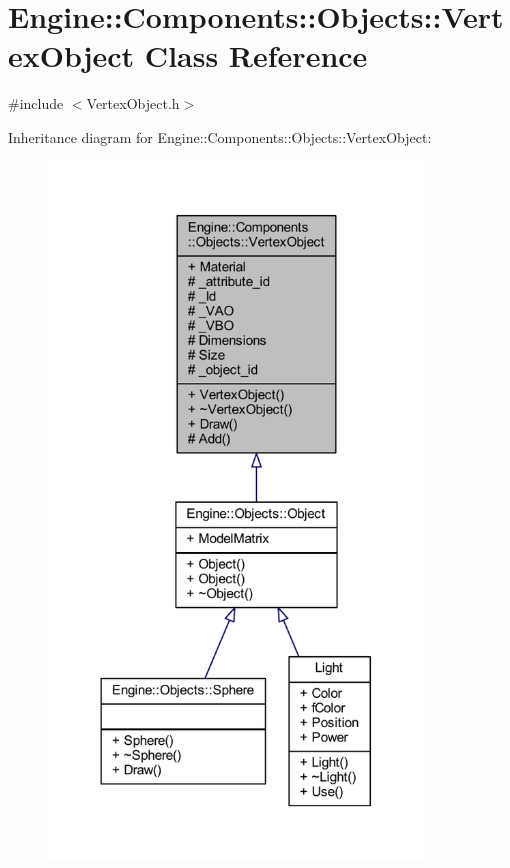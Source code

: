 \hypertarget{classEngine_1_1Components_1_1Objects_1_1VertexObject}{}\section{Engine\+:\+:Components\+:\+:Objects\+:\+:Vertex\+Object Class Reference}
\label{classEngine_1_1Components_1_1Objects_1_1VertexObject}


{\ttfamily \#include $<$Vertex\+Object.\+h$>$}



Inheritance diagram for Engine\+:\+:Components\+:\+:Objects\+:\+:Vertex\+Object\+:
\nopagebreak
\begin{figure}[H]
\begin{center}
\leavevmode
\includegraphics[width=282pt]{classEngine_1_1Components_1_1Objects_1_1VertexObject__inherit__graph}
\end{center}
\end{figure}


